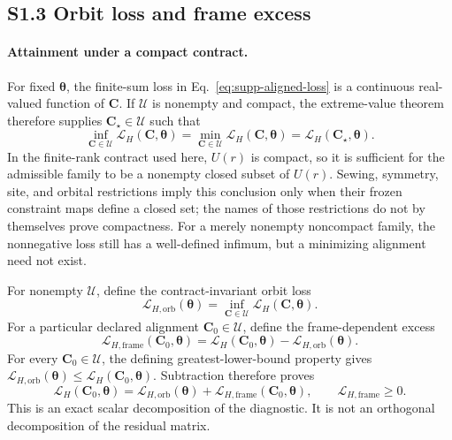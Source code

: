 \subsection*{S1.3 Orbit loss and frame excess}

\paragraph{Attainment under a compact contract.}
For fixed $\bm\theta$, the finite-sum loss in
Eq.~\eqref{eq:supp-aligned-loss} is a continuous real-valued function of
$\bm C$. If $\mathcal U$ is nonempty and compact, the extreme-value theorem
therefore supplies $\bm C_\star\in\mathcal U$ such that
\begin{equation*}
 \inf_{\bm C\in\mathcal U}\mathcal L_H(\bm C,\bm\theta)
 =\min_{\bm C\in\mathcal U}\mathcal L_H(\bm C,\bm\theta)
 =\mathcal L_H(\bm C_\star,\bm\theta).
\end{equation*}
In the finite-rank contract used here, $U(r)$ is compact, so it is sufficient
for the admissible family to be a nonempty closed subset of $U(r)$. Sewing,
symmetry, site, and orbital restrictions imply this conclusion only when their
frozen constraint maps define a closed set; the names of those restrictions do
not by themselves prove compactness. For a merely nonempty noncompact family,
the nonnegative loss still has a well-defined infimum, but a minimizing
alignment need not exist.

For nonempty $\mathcal U$, define the contract-invariant orbit loss
\begin{equation}
 \mathcal L_{H,\mathrm{orb}}(\bm\theta)
 =\inf_{\bm C\in\mathcal U}\mathcal L_H(\bm C,\bm\theta).
 \label{eq:supp-orbit-loss}
\end{equation}
For a particular declared alignment $\bm C_0\in\mathcal U$, define the
frame-dependent excess
\begin{equation}
 \mathcal L_{H,\mathrm{frame}}(\bm C_0,\bm\theta)
 =\mathcal L_H(\bm C_0,\bm\theta)
 -\mathcal L_{H,\mathrm{orb}}(\bm\theta).
 \label{eq:supp-frame-excess}
\end{equation}
For every $\bm C_0\in\mathcal U$, the defining greatest-lower-bound
property gives
$\mathcal L_{H,\mathrm{orb}}(\bm\theta)\leq
\mathcal L_H(\bm C_0,\bm\theta)$. Subtraction therefore proves
\begin{equation}
 \mathcal L_H(\bm C_0,\bm\theta)
 =\mathcal L_{H,\mathrm{orb}}(\bm\theta)
 +\mathcal L_{H,\mathrm{frame}}(\bm C_0,\bm\theta),
 \qquad
 \mathcal L_{H,\mathrm{frame}}\geq 0.
 \label{eq:supp-loss-decomposition}
\end{equation}
This is an exact scalar decomposition of the diagnostic. It is not an
orthogonal decomposition of the residual matrix.

